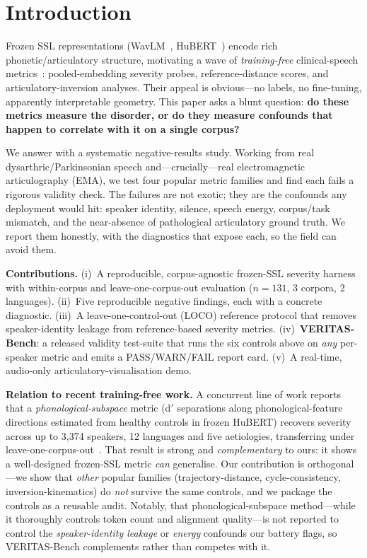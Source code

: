\documentclass[10pt,twocolumn]{article}
\begin{document}
\section{Introduction}
Frozen SSL representations (WavLM~\cite{chen2022wavlm},
HuBERT~\cite{hsu2021hubert}) encode rich phonetic/articulatory structure,
motivating a wave of \emph{training-free} clinical-speech
metrics~\cite{frozenssl2026a,frozenssl2026b}: pooled-embedding severity probes,
reference-distance scores, and articulatory-inversion analyses. Their appeal is
obvious---no labels, no fine-tuning, apparently interpretable geometry. This
paper asks a blunt question: \textbf{do these metrics measure the disorder, or
do they measure confounds that happen to correlate with it on a single corpus?}

We answer with a systematic negative-results study. Working from real
dysarthric/Parkinsonian speech and---crucially---real electromagnetic
articulography (EMA), we test four popular metric families and find each fails a
rigorous validity check. The failures are not exotic; they are the confounds any
deployment would hit: speaker identity, silence, speech energy, corpus/task
mismatch, and the near-absence of pathological articulatory ground truth. We
report them honestly, with the diagnostics that expose each, so the field can
avoid them.

\noindent\textbf{Contributions.}
(i)~A reproducible, corpus-agnostic frozen-SSL severity harness with
within-corpus and leave-one-corpus-out evaluation ($n{=}131$, 3 corpora, 2
languages).
(ii)~Five reproducible negative findings, each with a concrete diagnostic.
(iii)~A leave-one-control-out (LOCO) reference protocol that removes
speaker-identity leakage from reference-based severity metrics.
(iv)~\textbf{VERITAS-Bench}: a released validity test-suite that runs the six
controls above on \emph{any} per-speaker metric and emits a PASS/WARN/FAIL
report card.
(v)~A real-time, audio-only articulatory-visualisation demo.

\noindent\textbf{Relation to recent training-free work.} A concurrent line of
work reports that a \emph{phonological-subspace} metric (d$'$ separations along
phonological-feature directions estimated from healthy controls in frozen
HuBERT) recovers severity across up to 3{,}374 speakers, 12 languages and five
aetiologies, transferring under leave-one-corpus-out~\cite{frozenssl2026a,frozenssl2026b}.
That result is strong and \emph{complementary} to ours: it shows a well-designed
frozen-SSL metric \emph{can} generalise. Our contribution is orthogonal---we show
that \emph{other} popular families (trajectory-distance, cycle-consistency,
inversion-kinematics) do \emph{not} survive the same controls, and we package the
controls as a reusable audit. Notably, that phonological-subspace method---while
it thoroughly controls token count and alignment quality---is not reported to
control the \emph{speaker-identity leakage} or \emph{energy} confounds our battery
flags, so VERITAS-Bench complements rather than competes with it.
\end{document}
